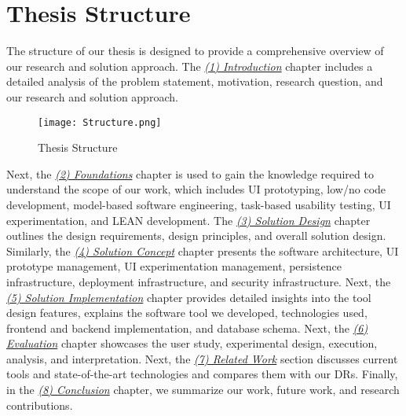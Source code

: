 \clearpage

\section{Thesis Structure}
The structure of our thesis is designed to provide a comprehensive overview of our research and solution approach.
The \textit{\hyperref[chap:introduction]{(1) Introduction}} chapter includes a detailed analysis of the problem statement, motivation, research question, and our research and solution approach.

\begin{figure}[htbp!]
    \centering
    \texttt{[image: Structure.png]}
    \caption{Thesis Structure}
    \label{intro:fig:structure}
\end{figure}

Next, the \textit{\hyperref[chap:foundations]{(2) Foundations}} chapter is used to gain the knowledge required to understand the scope of our work, which includes UI prototyping, low/no code development, model-based software engineering, task-based usability testing, UI experimentation, and LEAN development.
The \textit{\hyperref[chap:design]{(3) Solution Design}} chapter outlines the design requirements, design principles, and overall solution design. 
Similarly, the \textit{\hyperref[chap:concept]{(4) Solution Concept}} chapter presents the software architecture, UI prototype management, UI experimentation management, persistence infrastructure, deployment infrastructure, and security infrastructure.
Next, the \textit{\hyperref[chap:implementation]{(5) Solution Implementation}} chapter provides detailed insights into the tool design features, explains the software tool we developed, technologies used, frontend and backend implementation, and database schema. 
Next, the \textit{\hyperref[chap:evaluation]{(6) Evaluation}} chapter showcases the user study, experimental design, execution, analysis, and interpretation. 
Next, the \textit{\hyperref[chap:relatedWork]{(7) Related Work}} section discusses current tools and state-of-the-art technologies and compares them with our DRs.
Finally, in the \textit{\hyperref[chap:conclusion]{(8) Conclusion}} chapter, we summarize our work, future work, and research contributions.
